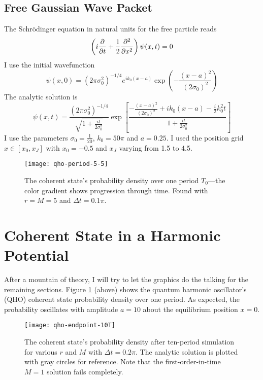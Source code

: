 \documentclass[11pt, a4paper]{article}
\newcommand{\schro}{Schr\"{o}dinger\xspace}
\begin{document}
\subsection{Free Gaussian Wave Packet}
The \schro equation in natural units for the free particle reads
\begin{equation*}
	\left(i \pdv{t} + \frac{1}{2}\pdv[2]{}{x}\right) \psi(x, t) = 0
\end{equation*}
I use the initial wavefunction
\begin{equation*}
	\psi(x, 0) = (2\pi \sigma_{0}^{2})^{-1/4}e^{ik_{0}(x - a)}\exp(-\frac{(x - a)^{2}}{(2\sigma_{0})^{2}})
\end{equation*}
The analytic solution is
\begin{equation*}
	\psi(x, t) = \frac{(2\pi \sigma_{0}^{2})^{-1/4}}{\sqrt{1 + \frac{it}{2\sigma_{0}^{2}}}} \exp \left[\frac{-\frac{(x-a)^{2}}{(2\sigma_{0})^{2}} + ik_{0}(x-a) - \tfrac{i}{2}k_{0}^{2}t}{1 + \frac{it}{2\sigma_{0}^{2}}}\right]
\end{equation*}
I use the parameters $ \sigma_{0} = \frac{1}{20} $, $ k_{0} = 50 \pi $ and $ a = 0.25 $. I used the position grid $ x \in [x_{0}, x_{J}] $ with $ x_{0} = -0.5 $ and $ x_{J} $ varying from 1.5 to 4.5. 



\begin{figure}[htb!]
\centering
\vspace{8mm}
\texttt{[image: qho-period-5-5]}
\caption{The coherent state's probability density over one period $ T_{0} $---the color gradient shows progression through time. Found with $ r = M = 5 $ and $ \Delta t = 0.1 \pi $.}
\label{diff:fig:qho-period}
\end{figure}

\section{Coherent State in a Harmonic Potential}  \label{diff:s:coherent}
After a mountain of theory, I will try to let the graphics do the talking for the remaining sections. Figure \ref{diff:fig:qho-period} (above) shows the quantum harmonic oscillator's (QHO) coherent state probability density over one period. As expected, the probability oscillates with amplitude $ a = 10 $ about the equilibrium position $ x = 0 $. 

\begin{figure}[htb!]
\centering
\texttt{[image: qho-endpoint-10T]}
\caption{The coherent state's probability density after ten-period simulation for various $ r $ and $ M $ with $ \Delta t = 0.2 \pi $. The analytic solution is plotted with gray circles for reference. Note that the first-order-in-time $ M=1 $ solution fails completely.}
\label{diff:fig:qho-endpoint}
\end{figure}
\end{document}
